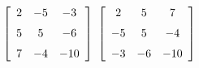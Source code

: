 {$\left[ \begin {array}{ccc} 2&-5&-3\\\noalign{\medskip}5&5&-6
\\\noalign{\medskip}7&-4&-10\end {array} \right] $}
{$\left[ \begin {array}{ccc} 2&5&7\\\noalign{\medskip}-5&5&-4
\\\noalign{\medskip}-3&-6&-10\end {array} \right]$}

